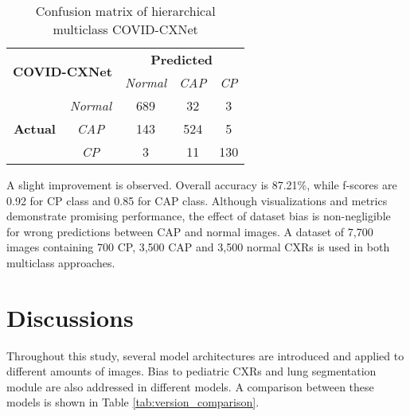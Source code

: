 \documentclass{article}
\begin{document}
\begin{table}[hpbt]
\caption{Confusion matrix of hierarchical multiclass COVID-CXNet}
\label{hierarchical_cxnet_cm}
\centering
\begin{tabular}{|c|c|c|c|c|}
\hline
\multicolumn{2}{|c|}{\multirow{2}{*}{\textbf{COVID-CXNet}}} & \multicolumn{3}{c|}{\textbf{Predicted}}      \\ \cline{3-5} 
\multicolumn{2}{|c|}{}                                     & \textit{Normal} & \textit{CAP} & \textit{CP} \\ \hline
\multirow{3}{*}{\textbf{Actual}}     & \textit{Normal}     & 689             & 32           & 3           \\ \cline{2-5} 
                                     & \textit{CAP}        & 143             & 524          & 5          \\ \cline{2-5} 
                                     & \textit{CP}         & 3               & 11           & 130         \\ \hline
\end{tabular}
\end{table}

A slight improvement is observed. Overall accuracy is 87.21\%, while f-scores are 0.92 for CP class and 0.85 for CAP class. Although visualizations and metrics demonstrate promising performance, the effect of dataset bias is non-negligible for wrong predictions between CAP and normal images. A dataset of 7,700 images containing 700 CP, 3,500 CAP and 3,500 normal CXRs is used in both multiclass approaches.


\section{Discussions}
Throughout this study, several model architectures are introduced and applied to different amounts of images. Bias to pediatric CXRs and lung segmentation module are also addressed in different models. A comparison between these models is shown in Table \ref{tab:version_comparison}.
\end{document}
